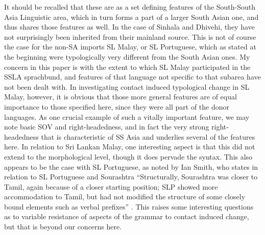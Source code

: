 It should be recalled that these are as a set defining  features of the South-South Asia Linguistic area, which in turn forms a part of a larger South Asian one, and thus shares those features as well. In the case of Sinhala and Dhivehi, they have not surprisingly been inherited from their mainland source. This is not of course the case for the non-SA imports SL Malay, or SL Portuguese, which  as stated at the beginning were typologically very different from the South Asian ones. My concern in this paper is with the extent to which SL Malay participated in the SSLA sprachbund, and features of that language not specific to that subarea have not been dealt with. In investigating contact induced typological change in SL Malay, however, it is obvious that those more general features are of equal importance to those specified here, since they were all part of the donor languages. As one crucial example of such a vitally important feature, we may note basic SOV and right-headedness, and in fact the very strong right-headedness that is characteristic of SS Asia and underlies several of the features here. In relation to Sri Lankan Malay, one interesting aspect is that this did not extend to the morphological level, though it does pervade the syntax. This also appears to be the case with SL Portuguese, as noted by Ian Smith, who states in relation to SL Portuguese and Sourashtra ``Structurally, Sourashtra was closer to Tamil, again because of a closer starting position; SLP showed more accommodation to Tamil, but had not modified the structure of some closely bound elements such as verbal prefixes'' \citep[408]{Smith2001}.\nocite{Smith2001} This raises some interesting questions as to variable resistance of aspects of the grammar to contact induced change, but that is beyond our concerns here.


